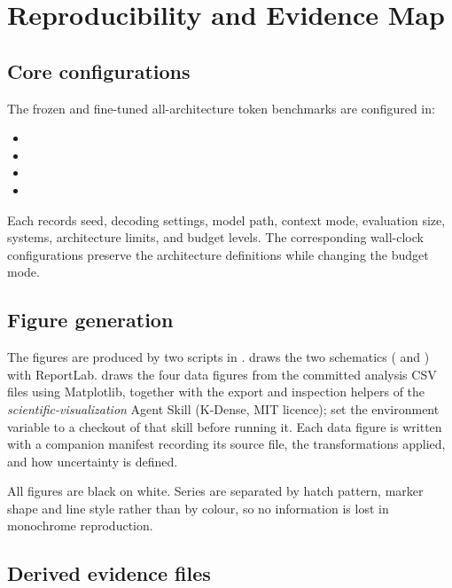 \chapter{Reproducibility and Evidence Map}
\label{app:reproducibility}

\section{Core configurations}

The frozen and fine-tuned all-architecture token benchmarks are configured in:
\begin{itemize}[leftmargin=*]
  \item {}
  \item {}
  \item {}
  \item {}
\end{itemize}

Each records seed, decoding settings, model path, context mode, evaluation size, systems, architecture limits, and budget levels. The corresponding wall-clock configurations preserve the architecture definitions while changing the budget mode.

\section{Figure generation}

The figures are produced by two scripts in .  draws the two schematics ( and ) with ReportLab.  draws the four data figures from the committed analysis CSV files using Matplotlib, together with the export and inspection helpers of the \emph{scientific-visualization} Agent Skill (K-Dense, MIT licence); set the  environment variable to a checkout of that skill before running it. Each data figure is written with a companion  manifest recording its source file, the transformations applied, and how uncertainty is defined.

All figures are black on white. Series are separated by hatch pattern, marker shape and line style rather than by colour, so no information is lost in monochrome reproduction.

\section{Derived evidence files}

